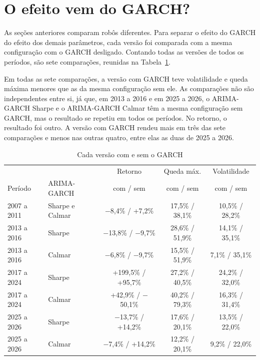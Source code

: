 \section{O efeito vem do GARCH?}
\label{sec:efeito-garch}

As seções anteriores comparam robôs diferentes. Para separar o efeito do GARCH do
efeito dos demais parâmetros, cada versão foi comparada com a mesma
configuração com o GARCH desligado. Contando todas as versões de todos os
períodos, são sete comparações, reunidas na
Tabela~\ref{tab:efeito}.

Em todas as sete comparações, a versão com GARCH teve volatilidade e queda máxima
menores que as da mesma configuração sem ele. As comparações não são
independentes entre si, já que, em 2013 a 2016 e em 2025 a 2026, o ARIMA-GARCH
Sharpe e o ARIMA-GARCH Calmar têm a mesma configuração sem GARCH, mas o resultado
se repetiu em todos os períodos. No retorno, o resultado foi outro. A versão com
GARCH rendeu mais em três das sete comparações e menos nas outras quatro, entre
elas as duas de 2025 a 2026.

\begin{table}[htbp]
\centering
\caption{Cada versão com e sem o GARCH}
\label{tab:efeito}
\fontsize{10}{12}\selectfont
\begin{tabular}{l|l|c|c|c}
\hline
& & Retorno & Queda máx. & Volatilidade \\
Período & ARIMA-GARCH & com / sem & com / sem & com / sem \\
\hline
2007 a 2011 & Sharpe e Calmar & $-$8,4\% / +7,2\% & 17,5\% / 38,1\% & 10,5\% / 28,2\% \\
\hline
2013 a 2016 & Sharpe & $-$13,8\% / $-$9,7\% & 28,6\% / 51,9\% & 14,1\% / 35,1\% \\
\hline
2013 a 2016 & Calmar & $-$6,8\% / $-$9,7\% & 15,5\% / 51,9\% & 7,1\% / 35,1\% \\
\hline
2017 a 2024 & Sharpe & +199,5\% / +95,7\% & 27,2\% / 40,5\% & 24,2\% / 32,0\% \\
\hline
2017 a 2024 & Calmar & +42,9\% / $-$50,1\% & 40,2\% / 79,3\% & 16,3\% / 31,4\% \\
\hline
2025 a 2026 & Sharpe & $-$13,7\% / +14,2\% & 17,6\% / 20,1\% & 13,5\% / 22,0\% \\
\hline
2025 a 2026 & Calmar & $-$7,4\% / +14,2\% & 12,2\% / 20,1\% & 9,2\% / 22,0\% \\
\hline
\end{tabular}
\end{table}

